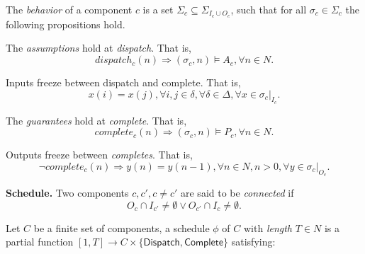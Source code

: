 
The \emph{behavior} of a component $c$ is a set $\Sigma_c \subseteq \Sigma_{I_c \cup O_c}$, such that for all $\sigma_c \in \Sigma_c$ the following propositions hold.

The \emph{assumptions} hold at \emph{dispatch}. That is,
\begin{equation} 
\label{eqn:assumption}
	dispatch_c(n) \Rightarrow (\sigma_c, n) \models A_c, \forall n\in N.
\end{equation}

Inputs freeze between dispatch and complete. That is,
\begin{equation} 
\label{eqn:inputfreeze}
	x(i) = x(j), \forall i,j\in \delta, \forall \delta \in \Delta, \forall x \in \sigma_c|_{I_c}.
\end{equation}

The \emph{guarantees} hold at \emph{complete}. That is,
\begin{equation} 
\label{eqn:guarantee}
	complete_c(n) \Rightarrow (\sigma_c, n) \models P_c, \forall n\in N.
\end{equation}


Outputs freeze between \emph{completes}. That is,
\begin{equation} 
\label{eqn:outputfreeze}
\lnot complete_c(n) \Rightarrow y(n) = y(n-1), \forall n \in N, n > 0, \forall y \in \sigma_c|_{O_c}.
\end{equation}

{\bf Schedule.}
Two components $ c, c', c\neq c'$ are said to be \emph{connected} if
\begin{equation*}
	O_c \cap I_{c'} \neq \emptyset \vee O_{c'} \cap I_c \neq \emptyset.
\end{equation*}

Let $C$ be a finite set of components, a schedule $\phi$ of $C$ with \emph{length} $T\in N$ is a partial function $[1, T] \rightarrow C\times \{\textsf{Dispatch}, \textsf{Complete}\}$ satisfying:

